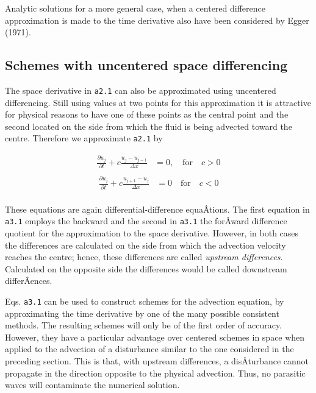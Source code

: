 Analytic solutions for a more general case, when a centered difference
approximation is made to the time derivative also have been considered
by Egger (1971).

\subsection{\texorpdfstring{\textbf{Schemes with uncentered space
differencing}}{Schemes with uncentered space differencing}}\label{schemes-with-uncentered-space-differencing}

The space derivative in \texttt{a2.1} can also be approximated using
uncentered differencing. Still using values at two points for this
approximation it is attractive for physical reasons to have one of these
points as the central point and the second located on the side from
which the fluid is being advected toward the centre. Therefore we
approximate \texttt{a2.1} by

{\[\begin{aligned}
\frac{\partial u_j}{\partial t} + c\frac{u_{j} - u_{j - 1}}{\Delta x} &= 0, \quad \textrm{for}
\quad c > 0 \\
\end{aligned}\]\[\begin{aligned}
\frac{\partial u_j}{\partial t} + c\frac{u_{j+1} - u_{j}}{\Delta x} &= 0 \quad \textrm{for}
\quad c < 0 \\
\end{aligned}\]}

These equations are again differential-difference equaÂ­tions. The first
equation in \texttt{a3.1} employs the backward and the second in
\texttt{a3.1} the forÂ­ward difference quotient for the approximation to
the space derivative. However, in both cases the differences are
calculated on the side from which the advection velocity reaches the
centre; hence, these differences are called \emph{upstream differences}.
Calculated on the opposite side the differences would be called
downstream differÂ­ences.

Eqs. \texttt{a3.1} can be used to construct schemes for the advection
equation, by approximating the time derivative by one of the many
possible consistent methods. The resulting schemes will only be of the
first order of accuracy. However, they have a particular advantage over
centered schemes in space when applied to the advection of a disturbance
similar to the one considered in the preceding section. This is that,
with upstream differences, a disÂ­turbance cannot propagate in the
direction opposite to the physical advection. Thus, no parasitic waves
will contaminate the numerical solution.

